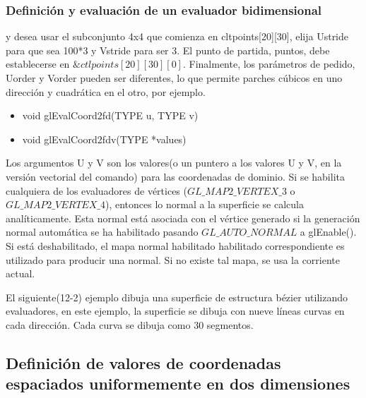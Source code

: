 \documentclass[10.5pt]{beamer}
\begin{document}
\begin{frame}[fragile]
    \frametitle{Definición y evaluación de un evaluador bidimensional}
    y desea usar el subconjunto 4x4 que comienza en cltpoints[20][30], elija Ustride para que sea 100*3 y
    Vstride para ser 3. El punto de partida, puntos, debe establecerse en $\&ctlpoints[20][30][0]$. Finalmente,
    los parámetros de pedido, Uorder y Vorder pueden ser diferentes, lo que permite parches cúbicos en uno
    dirección y cuadrática en el otro, por ejemplo.

    \begin{itemize}
        \item void glEvalCoord2{fd}(TYPE u, TYPE v)
        \item void glEvalCoord2{fd}v(TYPE *values)
    \end{itemize}

\end{frame}

\begin{frame}[fragile]
     Los argumentos U y V son los valores(o un puntero a los valores U y V, en la versión vectorial del comando) para las coordenadas de dominio.
    Si se habilita cualquiera de los evaluadores de vértices ($ GL\_MAP2\_VERTEX\_3 $ o $ GL\_MAP2\_VERTEX\_4 $),
    entonces lo normal a la superficie se calcula analíticamente. Esta normal está asociada con el
    vértice generado si la generación normal automática se ha habilitado pasando
    $GL\_AUTO\_NORMAL$ a glEnable(). Si está deshabilitado, el mapa normal habilitado habilitado correspondiente es
    utilizado para producir una normal. Si no existe tal mapa, se usa la corriente actual.

    El siguiente(12-2) ejemplo dibuja una superficie de estructura bézier utilizando evaluadores, en este
    ejemplo, la superficie se dibuja con nueve líneas curvas en cada dirección. Cada curva se dibuja como 30
    segmentos.

\end{frame}

\subsection{Definición de valores de coordenadas espaciados uniformemente en dos dimensiones}
\end{document}

